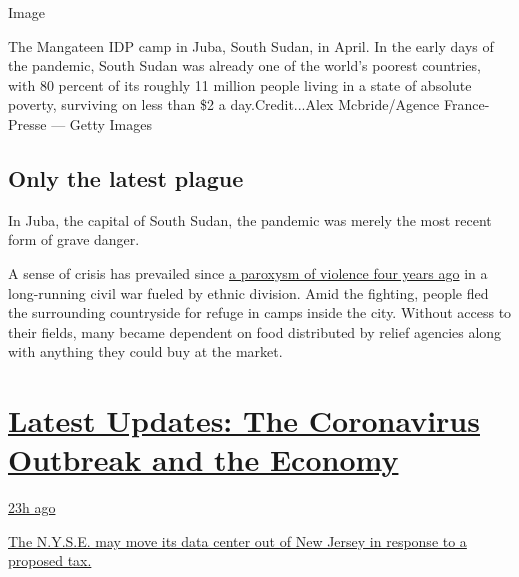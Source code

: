 Image

The Mangateen IDP camp in Juba, South Sudan, in April. In the early days
of the pandemic, South Sudan was already one of the world's poorest
countries, with 80 percent of its roughly 11 million people living in a
state of absolute poverty, surviving on less than \$2 a
day.Credit...Alex Mcbride/Agence France-Presse --- Getty Images

\hypertarget{only-the-latest-plague}{%
\subsection{Only the latest plague}\label{only-the-latest-plague}}

In Juba, the capital of South Sudan, the pandemic was merely the most
recent form of grave danger.

A sense of crisis has prevailed since
\href{https://www.nytimes3xbfgragh.onion/2016/03/12/world/africa/south-sudan-civil-war.html}{a
paroxysm of violence four years ago} in a long-running civil war fueled
by ethnic division. Amid the fighting, people fled the surrounding
countryside for refuge in camps inside the city. Without access to their
fields, many became dependent on food distributed by relief agencies
along with anything they could buy at the market.

\hypertarget{latest-updates-the-coronavirus-outbreak-and-the-economy}{%
\section{\texorpdfstring{\href{https://www.nytimes3xbfgragh.onion/live/2020/09/11/business/stock-market-today-coronavirus?action=click\&pgtype=Article\&state=default\&region=MAIN_CONTENT_1\&context=storylines_live_updates}{Latest
Updates: The Coronavirus Outbreak and the
Economy}}{Latest Updates: The Coronavirus Outbreak and the Economy}}\label{latest-updates-the-coronavirus-outbreak-and-the-economy}}

\href{https://www.nytimes3xbfgragh.onion/live/2020/09/11/business/stock-market-today-coronavirus?action=click\&pgtype=Article\&state=default\&region=MAIN_CONTENT_1\&context=storylines_live_updates\#the-nyse-may-move-its-data-center-out-of-new-jersey-in-response-to-a-proposed-tax}{23h
ago}

\href{https://www.nytimes3xbfgragh.onion/live/2020/09/11/business/stock-market-today-coronavirus?action=click\&pgtype=Article\&state=default\&region=MAIN_CONTENT_1\&context=storylines_live_updates\#the-nyse-may-move-its-data-center-out-of-new-jersey-in-response-to-a-proposed-tax}{The
N.Y.S.E. may move its data center out of New Jersey in response to a
proposed tax.}

